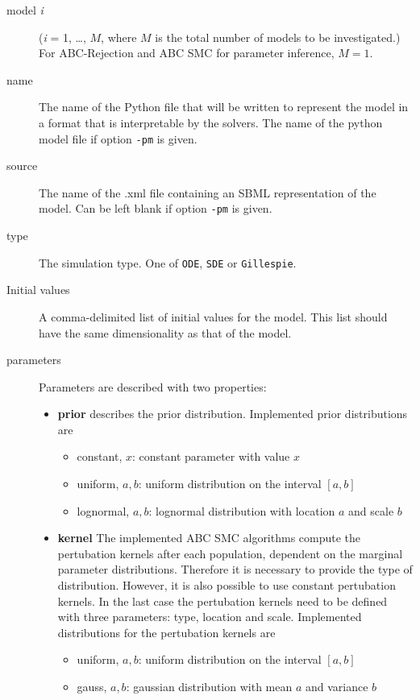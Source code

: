 \documentclass[a4paper]{report}
\begin{document}
\begin{description}
\item[model {\it i}] ({\it i} = 1, \dots, $M$, where $M$ is the total number of models to be investigated.) For ABC-Rejection and ABC SMC for parameter inference, $M = 1$.
\item[name] The name of the Python file that will be written to represent the model in a format that is interpretable by the solvers.  The name of the python model file if option \verb$-pm$ is given.
\item[source] The name of the .xml file containing an SBML representation of the model. Can be left blank if option \verb$-pm$ is given.
\item[type] The simulation type. One of \verb$ODE$, \verb$SDE$ or \verb$Gillespie$.
\item[Initial values] A comma-delimited list of initial values for the model. This list should have the same dimensionality as that of the model.
\item[parameters] Parameters are described with two properties:
\begin{itemize}
\item \textbf{prior} describes the prior distribution. Implemented prior distributions are
\begin{itemize}
\item constant, $x$: constant parameter with value $x$
\item uniform, $a, b$: uniform distribution on the interval $[a, b]$
\item lognormal, $a, b$: lognormal distribution with location $a$ and scale $b$ 
\end{itemize}
\item \textbf{kernel} The implemented ABC SMC algorithms compute the pertubation kernels after each population, dependent on the marginal parameter distributions. Therefore it is necessary to provide the type of distribution. However, it is also possible to use constant pertubation kernels. In the last case the pertubation kernels need to be defined with three parameters: type, location and scale. Implemented distributions for the pertubation kernels are
\begin{itemize}
\item uniform, $a, b$: uniform distribution on the interval $[a, b]$
\item gauss, $a, b$: gaussian distribution with mean $a$ and variance $b$
\end{itemize}
\end{itemize}
\end{description}
\end{document}
